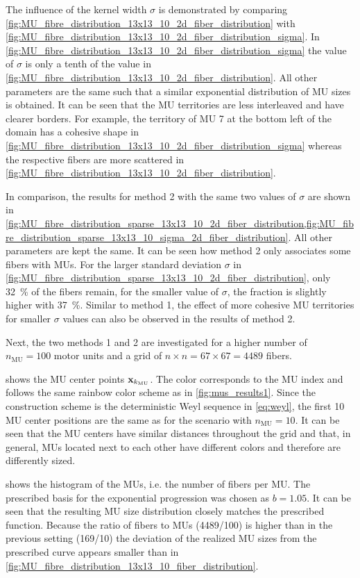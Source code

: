 The influence of the kernel width $\sigma$ is demonstrated by comparing \cref{fig:MU_fibre_distribution_13x13_10_2d_fiber_distribution} with \cref{fig:MU_fibre_distribution_13x13_10_2d_fiber_distribution_sigma}. In \cref{fig:MU_fibre_distribution_13x13_10_2d_fiber_distribution_sigma} the value of $\sigma$ is only a tenth of the value in \cref{fig:MU_fibre_distribution_13x13_10_2d_fiber_distribution}. All other parameters are the same such that a similar exponential distribution of MU sizes is obtained. It can be seen that the MU territories are less interleaved and have clearer borders. For example, the territory of MU 7 at the bottom left of the domain has a cohesive shape in \cref{fig:MU_fibre_distribution_13x13_10_2d_fiber_distribution_sigma} whereas the respective fibers are more scattered in \cref{fig:MU_fibre_distribution_13x13_10_2d_fiber_distribution}.

In comparison, the results for method 2 with the same two values of $\sigma$ are shown in \cref{fig:MU_fibre_distribution_sparse_13x13_10_2d_fiber_distribution,fig:MU_fibre_distribution_sparse_13x13_10_sigma_2d_fiber_distribution}. All other parameters are kept the same. It can be seen how method 2 only associates some fibers with MUs. For the larger standard deviation $\sigma$ in \cref{fig:MU_fibre_distribution_sparse_13x13_10_2d_fiber_distribution}, only \SI{32}{\percent} of the fibers remain, for the smaller value of $\sigma$, the fraction is slightly higher with \SI{37}{\percent}. Similar to method 1, the effect of more cohesive MU territories for smaller $\sigma$ values can also be observed in the results of method 2.

Next, the two methods 1 and 2 are investigated for a higher number of $n_\text{MU}=100$ motor units and a grid of $n \times n=67 \times 67 = \num{4489}$ fibers.

 shows the MU center points $\textbf{x}_{k_\text{MU}}$. The color corresponds to the MU index and follows the same rainbow color scheme as in \cref{fig:mus_results1}. Since the construction scheme is the deterministic Weyl sequence in \cref{eq:weyl}, the first 10 MU center positions are the same as for the scenario with $n_\text{MU}=10$. It can be seen that the MU centers have similar distances throughout the grid and that, in general, MUs located next to each other have different colors and therefore are differently sized.

 shows the histogram of the MUs, i.e. the number of fibers per MU. The prescribed basis for the exponential progression was chosen as $b=1.05$. It can be seen that the resulting MU size distribution closely matches the prescribed function. Because the ratio of fibers to MUs (4489/100) is higher than in the previous setting (169/10) the deviation of the realized MU sizes from the prescribed curve appears smaller than in \cref{fig:MU_fibre_distribution_13x13_10_fiber_distribution}.

